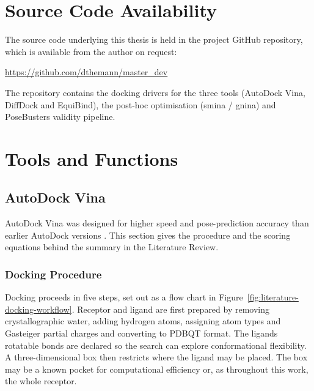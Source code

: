 \appendix

\hypertarget{source-code-and-data-availability}{%
\chapter{Source Code Availability}\label{source-code-and-data-availability}}

The source code underlying this thesis is held in the project GitHub repository, which is available from the author on request:

\begin{center}
\url{https://github.com/dthemann/master_dev}
\end{center}

\noindent The repository contains the docking drivers for the three tools (AutoDock Vina, DiffDock and EquiBind), the post-hoc optimisation (smina / gnina) and PoseBusters validity pipeline.

\hypertarget{tools-and-functions}{%
\chapter{Tools and Functions}\label{tools-and-functions}}

\hypertarget{autodock-vina-1}{%
\section{AutoDock Vina}\label{autodock-vina-1}}

AutoDock Vina was designed for higher speed and pose-prediction accuracy than earlier AutoDock versions \cite{ref022}. This section gives the procedure and the scoring equations behind the summary in the Literature Review.

\hypertarget{vina-docking-procedure}{%
\subsection{Docking Procedure}\label{vina-docking-procedure}}

Docking proceeds in five steps, set out as a flow chart in Figure~\ref{fig:literature-docking-workflow}. Receptor and ligand are first prepared by removing crystallographic water, adding hydrogen atoms, assigning atom types and Gasteiger partial charges and converting to PDBQT format. The ligand\textquotesingle s rotatable bonds are declared so the search can explore conformational flexibility. A three-dimensional box then restricts where the ligand may be placed. The box may be a known pocket for computational efficiency or, as throughout this work, the whole receptor.

